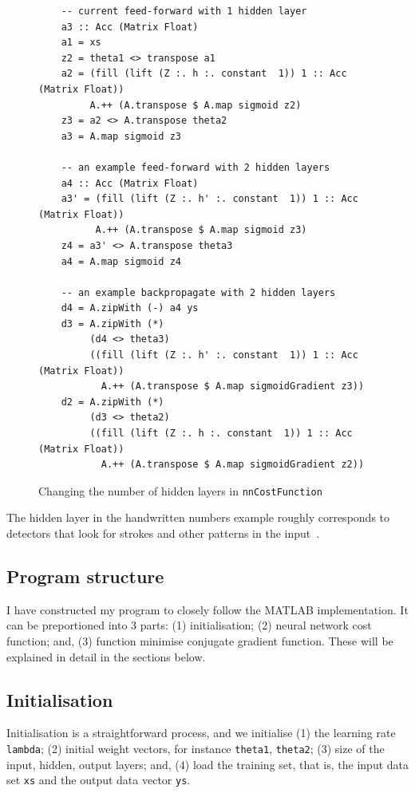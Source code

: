 \begin{figure}
  \begin{lstlisting}
    -- current feed-forward with 1 hidden layer
    a3 :: Acc (Matrix Float)
    a1 = xs 
    z2 = theta1 <> transpose a1 
    a2 = (fill (lift (Z :. h :. constant  1)) 1 :: Acc (Matrix Float)) 
         A.++ (A.transpose $ A.map sigmoid z2) 
    z3 = a2 <> A.transpose theta2 
    a3 = A.map sigmoid z3
    
    -- an example feed-forward with 2 hidden layers
    a4 :: Acc (Matrix Float)
    a3' = (fill (lift (Z :. h' :. constant  1)) 1 :: Acc (Matrix Float))
          A.++ (A.transpose $ A.map sigmoid z3)
    z4 = a3' <> A.transpose theta3
    a4 = A.map sigmoid z4
    
    -- an example backpropagate with 2 hidden layers
    d4 = A.zipWith (-) a4 ys
    d3 = A.zipWith (*) 
         (d4 <> theta3)
         ((fill (lift (Z :. h' :. constant  1)) 1 :: Acc (Matrix Float)) 
           A.++ (A.transpose $ A.map sigmoidGradient z3)) 
    d2 = A.zipWith (*) 
         (d3 <> theta2)
         ((fill (lift (Z :. h :. constant  1)) 1 :: Acc (Matrix Float)) 
           A.++ (A.transpose $ A.map sigmoidGradient z2)) 
  \end{lstlisting}
  \caption{Changing the number of hidden layers in \texttt{nnCostFunction}}
  \label{fig:nnCostFunction.hiddenlayers}
\end{figure}

The hidden layer in the handwritten numbers example roughly corresponds to detectors that look for strokes and other patterns in the input~\cite{Ng12}.

\subsection{Program structure} \label{se:impl.program.struct}

I have constructed my program to closely follow the MATLAB implementation. It can be preportioned into 3 parts: (1) initialisation; (2) neural network cost function; and, (3) function minimise conjugate gradient function. These will be explained in detail in the sections below.

\subsection{Initialisation} \label{se:impl.init}

Initialisation is a straightforward process, and we initialise (1) the learning rate \texttt{lambda}; (2) initial weight vectors, for instance \texttt{theta1}, \texttt{theta2}; (3) size of the input, hidden, output layers; and, (4) load the training set, that is, the input data set \texttt{xs} and the output data vector \texttt{ys}. 

